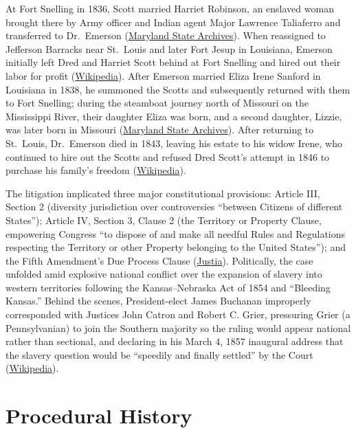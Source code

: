 \documentclass[12pt]{article}
\begin{document}
At Fort Snelling in 1836, Scott married Harriet Robinson, an enslaved woman brought there by Army officer and Indian agent Major Lawrence Taliaferro and transferred to Dr.\ Emerson (\href{https://msa.maryland.gov/megafile/msa/speccol/sc5300/sc5339/000091/000000/000004/restricted/dred_scott/decision/daniel.html}{Maryland State Archives}). When reassigned to Jefferson Barracks near St.\ Louis and later Fort Jesup in Louisiana, Emerson initially left Dred and Harriet Scott behind at Fort Snelling and hired out their labor for profit (\href{https://en.wikipedia.org/wiki/Dred_Scott_v._Sandford}{Wikipedia}). After Emerson married Eliza Irene Sanford in Louisiana in 1838, he summoned the Scotts and subsequently returned with them to Fort Snelling; during the steamboat journey north of Missouri on the Mississippi River, their daughter Eliza was born, and a second daughter, Lizzie, was later born in Missouri (\href{https://msa.maryland.gov/megafile/msa/speccol/sc5300/sc5339/000091/000000/000004/restricted/dred_scott/decision/daniel.html}{Maryland State Archives}). After returning to St.\ Louis, Dr.\ Emerson died in 1843, leaving his estate to his widow Irene, who continued to hire out the Scotts and refused Dred Scott's attempt in 1846 to purchase his family's freedom (\href{https://en.wikipedia.org/wiki/Dred_Scott_v._Sandford}{Wikipedia}).

The litigation implicated three major constitutional provisions: Article III, Section 2 (diversity jurisdiction over controversies ``between Citizens of different States''); Article IV, Section 3, Clause 2 (the Territory or Property Clause, empowering Congress ``to dispose of and make all needful Rules and Regulations respecting the Territory or other Property belonging to the United States''); and the Fifth Amendment's Due Process Clause (\href{https://supreme.justia.com/cases/federal/us/60/393/}{Justia}). Politically, the case unfolded amid explosive national conflict over the expansion of slavery into western territories following the Kansas--Nebraska Act of 1854 and ``Bleeding Kansas.'' Behind the scenes, President-elect James Buchanan improperly corresponded with Justices John Catron and Robert C. Grier, pressuring Grier (a Pennsylvanian) to join the Southern majority so the ruling would appear national rather than sectional, and declaring in his March 4, 1857 inaugural address that the slavery question would be ``speedily and finally settled'' by the Court (\href{https://en.wikipedia.org/wiki/Dred_Scott_v._Sandford}{Wikipedia}).

\section{Procedural History}
\end{document}
